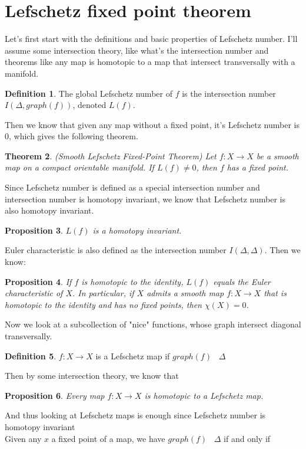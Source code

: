 \documentclass[psamsfonts]{amsart}
\newtheorem{theorem}{Theorem}[section]
\newtheorem{prop}[theorem]{Proposition}
\theoremstyle{definition}
\newtheorem{defn}[theorem]{Definition}
\theoremstyle{remark}
\numberwithin{equation}{section}
\begin{document}
	\section{Lefschetz fixed point theorem}
	Let's first start with the definitions and basic properties of Lefschetz number. I'll assume some intersection theory, like what's the intersection number and theorems like any map is homotopic to a map that intersect transversally with a manifold. 
	\begin{defn}
			The global Lefschetz number of $f$ is the intersection number $I(\Delta, graph(f))$, denoted $L(f)$.
		\end{defn}
		Then we know that given any map without a fixed point, it's Lefschetz number is $0$, which gives the following theorem.
		\begin{theorem}(Smooth Lefschetz Fixed-Point Theorem)
			Let $f:X \to X$ be a smooth map on a compact orientable manifold. If $L(f) \neq 0$, then $f$ has a fixed point.			
		\end{theorem}
		Since Lefschetz number is defined as a special intersection number	and intersection number is homotopy invariant, we know that Lefschetz number is also homotopy invariant.
		\begin{prop}
			$L(f)$ is a homotopy invariant.
		\end{prop}
		Euler characteristic is also defined as the intersection number $I(\Delta, \Delta)$. Then we know:
		\begin{prop}
			If $f$ is homotopic to the identity,  $L(f)$ equals the Euler characteristic of $X$. In particular, if $X$ admits a smooth map $f: X \to X$ that is homotopic to the identity and has no fixed points, then $\chi(X) = 0$.
		\end{prop}
		Now we look at a subcollection of "nice" functions, whose graph intersect diagonal transversally.
		\begin{defn}
			$f: X \to X$ is a Lefschetz map if $graph(f)$ \;\;\makebox[0pt]{$\top$}\makebox[0pt]{$\cap$}\;\ $\Delta$
		\end{defn}
		Then by some intersection theory, we know that  
		\begin{prop}
			Every map $f: X \to X$ is homotopic to a Lefschetz map.
		\end{prop}
		And thus looking at Lefschetz maps is enough since Lefschetz number is homotopy invariant\\
		\indent Given any $x$ a fixed point of a  map, we have $graph(f)$ \;\;\makebox[0pt]{$\top$}\makebox[0pt]{$\cap$}\;\ $\Delta$ if and only if
\end{document}
